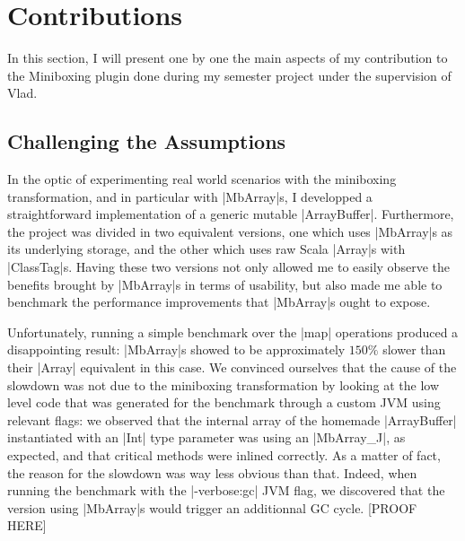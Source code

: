 \section{Contributions}
\label{sec:contrib}

In this section, I will present one by one the main aspects of my contribution to the Miniboxing plugin done during my semester project under the supervision of Vlad.
\subsection{Challenging the Assumptions} 

In the optic of experimenting real world scenarios with the miniboxing transformation, and in particular with |MbArray|s, I developped a straightforward implementation of a generic mutable |ArrayBuffer|. Furthermore, the project was divided in two equivalent versions, one which uses |MbArray|s as its underlying storage, and the other which uses raw Scala |Array|s with |ClassTag|s. Having these two versions not only allowed me to easily observe the benefits brought by |MbArray|s in terms of usability, but also made me able to benchmark the performance improvements that |MbArray|s ought to expose.


Unfortunately, running a simple benchmark over the |map| operations produced a disappointing result: |MbArray|s showed to be approximately $150\%$ slower than their |Array| equivalent in this case. We convinced ourselves that the cause of the slowdown was not due to the miniboxing transformation by looking at the low level code that was generated for the benchmark through a custom JVM using relevant flags: we observed that the internal array of the homemade |ArrayBuffer| instantiated with an |Int| type parameter was using an |MbArray_J|, as expected, and that critical methods were inlined correctly. As a matter of fact, the reason for the slowdown was way less obvious than that. Indeed, when running the benchmark with the |-verbose:gc| JVM flag, we discovered that the version using |MbArray|s would trigger an additionnal GC cycle. [PROOF HERE]

